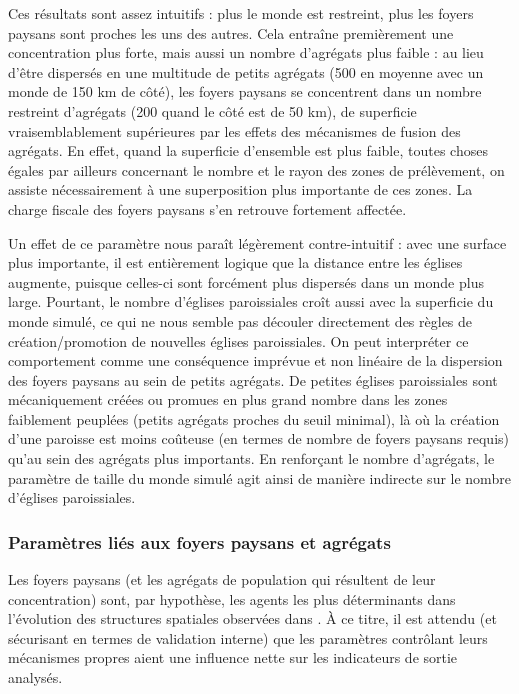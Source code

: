 Ces résultats sont assez intuitifs : plus le monde est restreint, plus les foyers paysans sont proches les uns des autres.
Cela entraîne premièrement une concentration plus forte, mais aussi un nombre d'agrégats plus faible : au lieu d'être dispersés en une multitude de petits agrégats (500 en moyenne avec un monde de 150 km de côté), les foyers paysans se concentrent dans un nombre restreint d'agrégats (200 quand le côté est de 50 km), de superficie vraisemblablement supérieures par les effets des mécanismes de fusion des agrégats.
En effet, quand la superficie d'ensemble est plus faible, toutes choses égales par ailleurs concernant le nombre et le rayon des zones de prélèvement, on assiste nécessairement à une superposition plus importante de ces zones.
La charge fiscale des foyers paysans s'en retrouve fortement affectée.

Un effet de ce paramètre nous paraît légèrement contre-intuitif : avec une surface plus importante, il est entièrement logique que la distance entre les églises augmente, puisque celles-ci sont forcément plus dispersés dans un monde plus large.
Pourtant, le nombre d'églises paroissiales croît aussi avec la superficie du monde simulé, ce qui ne nous semble pas découler directement des règles de création/promotion de nouvelles églises paroissiales.
On peut interpréter ce comportement comme une conséquence imprévue et non linéaire de la dispersion des foyers paysans au sein de petits agrégats.
De petites églises paroissiales sont mécaniquement créées ou promues en plus grand nombre dans les zones faiblement peuplées (petits agrégats proches du seuil minimal), là où la création d'une paroisse est moins coûteuse (en termes de nombre de foyers paysans requis) qu'au sein des agrégats plus importants.
En renforçant le nombre d'agrégats, le paramètre de taille du monde simulé agit ainsi de manière indirecte sur le nombre d'églises paroissiales.

\subsubsection{Paramètres liés aux foyers paysans et agrégats \label{subsubsec:sensib-fp}}

Les foyers paysans (et les agrégats de population qui résultent de leur concentration) sont, par hypothèse, les agents les plus déterminants dans l'évolution des structures spatiales observées dans \simfeodal{}.
À ce titre, il est attendu (et sécurisant en termes de validation interne) que les paramètres contrôlant leurs mécanismes propres aient une influence nette sur les indicateurs de sortie analysés.

